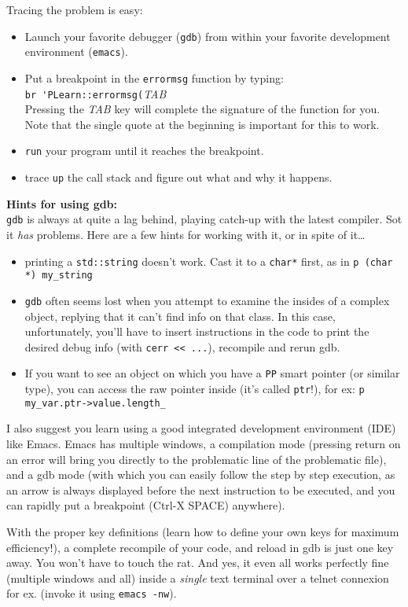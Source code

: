 \documentclass[11pt]{book}
\begin{document}
Tracing the problem is easy: 
\begin{itemize}
\item Launch your favorite debugger ({\tt gdb}) from within your favorite 
development environment ({\tt emacs}). 
\item Put a breakpoint in the {\tt errormsg} function by typing: \\
\verb!br 'PLearn::errormsg(!{\it TAB} \\ 
Pressing the {\it TAB} key will complete the
signature of the function for you. Note that the single quote at the beginning is important for this to work.
\item {\tt run} your program until it reaches the breakpoint.
\item trace {\tt up} the call stack and figure out what and why it happens.
\end{itemize}

{\bf Hints for using gdb:} \\
{\tt gdb} is always at quite a lag behind, playing catch-up with the latest compiler. Sot it {\em has} problems.
Here are a few hints for working with it, or in spite of it\ldots
\begin{itemize}
\item printing a {\tt std::string} doesn't work. Cast it to a {\tt char*} first, as in \verb!p (char *) my_string!
\item {\tt gdb} often seems lost when you attempt to examine the insides of a complex
  object, replying that it can't find info on that class.  In this case,
  unfortunately, you'll have to insert instructions in the code to print the desired debug info
  (with \verb!cerr << ...!), recompile and rerun gdb.
\item If you want to see an object on which you have a {\tt PP} smart
  pointer (or similar type), you can access the raw pointer inside (it's
  called {\tt ptr}!), for ex: \verb!p my_var.ptr->value.length_!
\end{itemize}

I also suggest you learn using a good integrated development
environment (IDE) like Emacs. Emacs has multiple windows, a compilation
mode (pressing return on an error will bring you directly to the
problematic line of the problematic file), and a gdb mode (with
which you can easily follow the step by step execution, as an arrow
is always displayed before the next instruction to be executed, and
you can rapidly put a breakpoint (Ctrl-X SPACE) anywhere).

With the proper key definitions (learn how to define your own keys for
maximum efficiency!), a complete recompile of your code, and reload in
gdb is just one key away.  You won't have to touch the rat. And yes,
it even all works perfectly fine (multiple windows and all) inside
a {\em single} text terminal over a telnet connexion for ex. (invoke
it using \verb!emacs -nw!).
\end{document}
